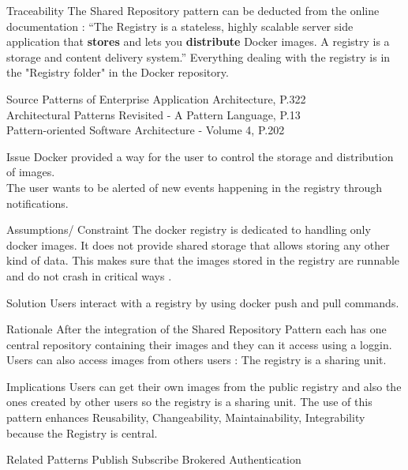 \begin{patdescription}
\item[Traceability]
The Shared Repository pattern can be deducted from the online documentation : \cite{dockregistry} ``The Registry is a stateless, highly scalable server side application that \textbf{stores} and lets you \textbf{distribute} Docker images. A registry is a storage and content delivery system.''
Everything dealing with the registry is in the "Registry folder" in the Docker repository.


\item[Source]
Patterns of Enterprise Application Architecture, P.322 \cite{eaa}\\
Architectural Patterns Revisited - A Pattern Language, P.13 \cite{avgeriou2005architectural}\\
Pattern-oriented Software Architecture - Volume 4, P.202 \cite{wiley4}

\item[Issue]
Docker provided a way for the user to control the storage and distribution of images. \\
The user wants to be alerted of new events happening in the registry through notifications. %

\item[Assumptions/ Constraint]
The docker registry is dedicated to handling only docker images. It does not provide shared storage that allows storing any other kind of data. This makes sure that the images stored in the registry are runnable and do not crash in critical ways .


\item[Solution] %
Users interact with a registry by using docker push and pull commands. %

\item[Rationale] %
 After the integration of the Shared Repository Pattern each has one central repository containing their images and they can it access using a loggin.
 Users can also access images from others users : The registry is a sharing unit. \\
 
 \item [Implications]
Users can get their own images from the public registry and also the ones created by other users so the registry is a sharing unit. %
The use of this pattern enhances Reusability, Changeability, Maintainability, Integrability because the Registry is central.

\item [Related Patterns]
Publish Subscribe 
Brokered Authentication

 
\end{patdescription}

